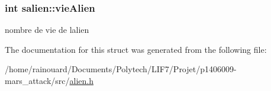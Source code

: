 \subsubsection[{\texorpdfstring{vie\+Alien}{vieAlien}}]{\setlength{\rightskip}{0pt plus 5cm}int salien\+::vie\+Alien}\hypertarget{structsalien_af36f8e1a34c1fc9abfbb18314091beb2}{}\label{structsalien_af36f8e1a34c1fc9abfbb18314091beb2}
nombre de vie de l\textquotesingle{}alien 

The documentation for this struct was generated from the following file\+:\begin{DoxyCompactItemize}
\item 
/home/rainouard/\+Documents/\+Polytech/\+L\+I\+F7/\+Projet/p1406009-\/mars\+\_\+attack/src/\hyperlink{alien_8h}{alien.\+h}\end{DoxyCompactItemize}
